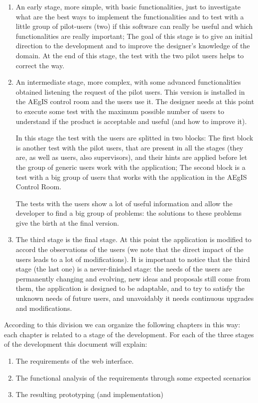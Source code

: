 \begin{enumerate}

\item An early stage, more simple, with basic functionalities, just to investigate what are the best ways to implement the functionalities and to test with a little group of pilot-users (two) if this software can really be useful and which functionalities are really important; The goal of this stage is to give an initial direction to the development and to improve the designer's knowledge of the domain. At the end of this stage, the test with the two pilot users helps to correct the way.

\item An intermediate stage, more complex, with some advanced functionalities obtained listening the request of the pilot users. This version is installed in the AEgIS control room and the users use it. 
The designer needs at this point to execute some test with the maximum possible number of users to understand if the product is acceptable and useful (and how to improve it). 

In this stage the test with the users are splitted in two blocks:  
The first block is another test with the pilot users, that are present in all the stages (they are, as well as users, also supervisors), and their hints are applied before let the group of generic users work with the application;
The second block is a test with a big group of users that works with the application in the AEgIS Control Room.

The tests with the users show a lot of useful information and allow the developer to find a big group of problems: the solutions to these problems give the birth at the final version. 

\item
The third stage is the final stage. At this point the application is modified to accord the observations of the users (we note that the direct impact of the users leads to a lot of modifications). It is important to notice that the third stage (the last one) is a never-finished stage: the needs of the users are permanently changing and evolving, new ideas and proposals still come from them, the application is designed to be adaptable, and to try to satisfy the unknown needs of future users, and unavoidably it needs continuous upgrades and modifications. 

\end{enumerate}

According to this division we can organize the following chapters in this way:
each chapter is related to a stage of the development.
For each of the three stages of the development this document will explain:

\begin {enumerate}

\item
The requirements of the web interface.

\item
The functional analysis of the requirements through some expected scenarios

\item
The resulting prototyping (and implementation)  

\end {enumerate} 

